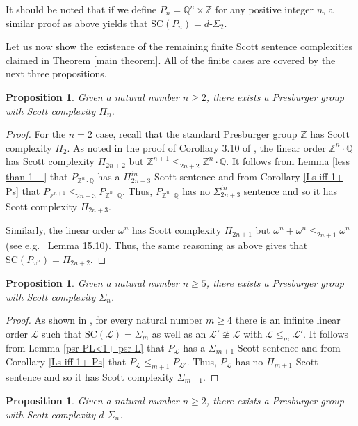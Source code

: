 \documentclass{amsart}%
\numberwithin{theorem}{section}
\newtheorem{proposition}[theorem]{Proposition}
\newcommand{\Q}{\mathbb{Q}}
\newcommand{\Z}{\mathbb{Z}}
\newcommand{\0}{\emptyset}
\newcommand{\LL}{\mathcal{L}}
\newcommand{\SC}{\text{SC}}
\begin{document}
It should be noted that if we define $P_n=\Q^n\times \Z$ for any positive integer $n$, a similar proof as above yields that $\SC(P_n)=d$-$\Sigma_2$.

Let us now show the existence of the remaining finite Scott sentence complexities claimed in Theorem \ref{main theorem}. All of the finite cases are covered by the next three propositions.

\begin{proposition}
\label{pi_n sc}
    Given a natural number $n\geq 2$, there exists a Presburger group with Scott complexity $\Pi_n$.
\end{proposition}

\begin{proof}
    For the $n=2$ case, recall that the standard Presburger group $\Z$ has Scott complexity $\Pi_2$. As noted in the proof of Corollary 3.10 of \cite{david-dino}, the linear order $\Z^n\cdot\Q$ has Scott complexity $\Pi_{2n+2}$ but $\Z^{n+1}\leq_{2n+2} \Z^n\cdot\Q$. It follows from Lemma \ref{less than 1 +} that $P_{\Z^n\cdot \Q}$ has a $\Pi^{in}_{2n+3}$ Scott sentence and from Corollary \ref{Ls iff 1+ Ps} that $P_{\Z^{n+1}}\leq_{2n+3} P_{\Z^n\cdot \Q}$. Thus, $P_{\Z^n\cdot \Q}$ has no $\Sigma^{in}_{2n+3}$ sentence and so it has Scott complexity $\Pi_{2n+3}$. 

    Similarly, the linear order $\omega^n$ has Scott complexity $\Pi_{2n+1}$ but $\omega^n+\omega^n\leq_{2n+1} \omega^n$ (see e.g.\ \cite{AK-book} Lemma 15.10). Thus, the same reasoning as above gives that $\SC(P_{\omega^n})=\Pi_{2n+2}$. 
\end{proof}

\begin{proposition}
\label{sigma_n sc}
Given a natural number $n\geq 5$, there exists a Presburger group with Scott complexity $\Sigma_n$. 
\end{proposition}

\begin{proof}
As shown in \cite{david-dino}, for every natural number $m\geq 4$ there is an infinite linear order $\LL$ such that $\SC(\LL)=\Sigma_m$ as well as an $\LL'\ncong \LL$ with $\LL\leq_m\LL'$. It follows from Lemma \ref{psr PL<1+ psr L} that $P_\LL$ has a $\Sigma_{m+1}$ Scott sentence and from Corollary \ref{Ls iff 1+ Ps} that $P_\LL\leq_{m+1} P_{\LL'}$.  Thus, $P_\LL$ has no $\Pi_{m+1}$ Scott sentence and so it has Scott complexity $\Sigma_{m+1}$. 
\end{proof}

\begin{proposition}
\label{d-sigma_n sc}
    Given a natural number $n\geq 2$, there exists a Presburger group with Scott complexity $d$-$\Sigma_n$. 
\end{proposition}
\end{document}
